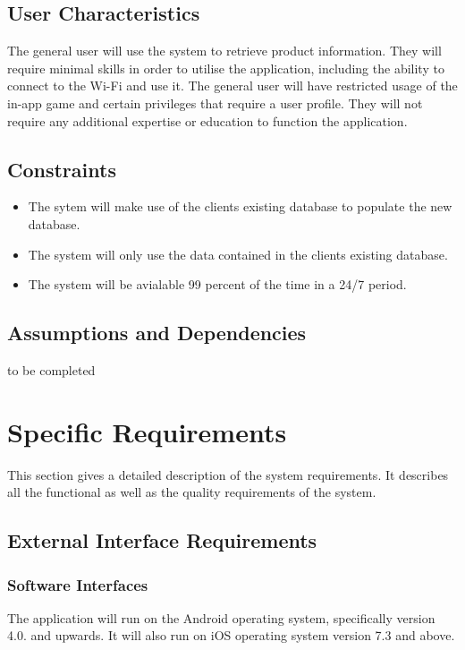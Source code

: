 \documentclass[a4paper,10pt]{article}
\begin{document}
    	\subsection{User Characteristics}  
		{ 
	
{The general user will use the system to retrieve product information. They will require minimal skills in order to utilise the application, including the ability to connect to the Wi-Fi and use it. The general user will have restricted usage of the in-app game and certain privileges that require a user profile. They will not require any additional expertise or education to function the application.\\}
    	\subsection{Constraints}
	\begin{itemize}
		\item The sytem will make use of the clients existing database to populate the new database.
		\item The system will only use the data contained in the clients existing database.
		\item The system will be avialable 99 percent of the time in a 24/7 period.
		
	\end{itemize}
	
    	\subsection{Assumptions and Dependencies}
to be completed

	\newpage
		
	\section{Specific Requirements}
This section gives a detailed description of the system requirements. It describes all the functional as well as the quality requirements of the system.

	\subsection{External Interface Requirements}

                 \subsubsection{Software Interfaces}
The application will run on the Android operating system, specifically version 4.0. and upwards. It will also run on iOS operating system version 7.3 and above.

}
\end{document}
